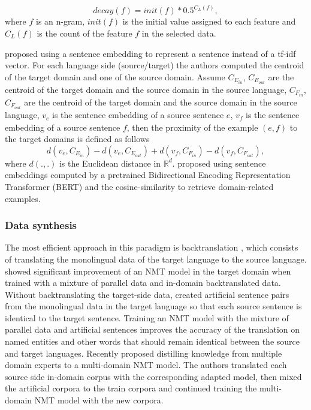 \begin{equation}
decay(f) = init(f) * 0.5 ^{C_{L}(f)},
\end{equation}
where $f$ is an n-gram, $init(f)$ is the initial value assigned to each feature and $C_{L}(f)$ is the count of the feature $f$ in the selected data.

\citet{Wang17sentence} proposed using a sentence embedding to represent a sentence instead of a tf-idf vector. For each language side (source/target) the authors computed the centroid of the target domain and one of the source domain. Assume $C_{E_{in}}$, $C_{E_{out}}$ are the centroid of the target domain and the source domain in the source language,  $C_{F_{in}}$, $C_{F_{out}}$ are the centroid of the target domain and the source domain in the source language, $v_{\mathit{e}}$ is the sentence embedding of a source sentence $\mathit{e}$, $v_{\mathit{f}}$ is the sentence embedding of a source sentence $\mathit{f}$, then the proximity of the example $(\mathit{e},\mathit{f})$ to the target domains is defined as follows
\begin{equation}
d(v_{\mathit{e}}, C_{E_{in}}) - d(v_{\mathit{e}}, C_{E_{out}}) + d(v_{\mathit{f}}, C_{F_{in}}) - d(v_{\mathit{f}}, C_{F_{out}}),
\end{equation} 
where $d(.,.)$ is the Euclidean distance in $\mathbb{R}^d$. \citet{Aharoni20unsupervised} proposed using sentence embeddings computed by a pretrained Bidirectional Encoding Representation Transformer (BERT) and the cosine-similarity to retrieve domain-related examples.

\subsubsection{Data synthesis}
The most efficient approach in this paradigm is backtranslation \citep{Sennrich16improving}, which consists of translating the monolingual data of the target language to the source language. \citet{Burlot18using} showed significant improvement of an NMT model in the target domain when trained with a mixture of parallel data and in-domain backtranslated data. Without backtranslating the target-side data, \citet{Currey17copied} created artificial sentence pairs from the monolingual data in the target language so that each source sentence is identical to the target sentence. Training an NMT model with the mixture of parallel data and artificial sentences improves the accuracy of the translation on named entities and other words that should remain identical between the source and target languages. Recently \citet{currey20distilling} proposed distilling knowledge from multiple domain experts to a multi-domain NMT model. The authors translated each source side in-domain corpus with the corresponding adapted model, then mixed the artificial corpora to the train corpora and continued training the multi-domain NMT model with the new corpora.

